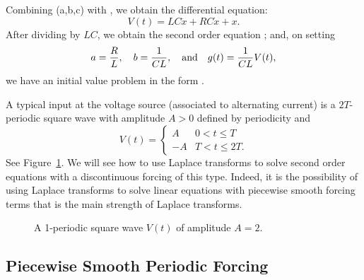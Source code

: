 Combining (a,b,c) with , we obtain the differential equation:
\[
V(t) = LC\ddot{x} + RC\dot{x} +  x.
\]
After dividing by $LC$, we obtain the second order equation ;
and, on setting 
\[
a = \frac{R}{L}, \quad b = \frac{1}{CL}, \quad\mbox{and}\quad g(t) = \frac{1}{CL}V(t),
\] 
we have an initial value problem in the form .

A typical input at the voltage source 
(associated to alternating current) is 
a $2T$-periodic square wave with amplitude $A>0$ defined by periodicity and
\[
V(t) = \left\{\begin{array}{rl} A & 0<t\leq T\\
			       -A & T<t\leq 2T.
	\end{array}\right.
\]
See Figure~\ref{fig:sq}.  We will see how to use Laplace transforms to solve 
second order equations with a discontinuous forcing 
of this type.  Indeed,
it is the possibility of using Laplace transforms to solve linear equations 
with piecewise smooth forcing terms that is 
the main strength of Laplace
transforms.

\begin{figure}[htb]
           \centerline{%
           }
           \caption{A 1-periodic square wave $V(t)$ of amplitude $A=2$.}
           \label{fig:sq}
\end{figure}


\subsection*{Piecewise Smooth Periodic Forcing}

